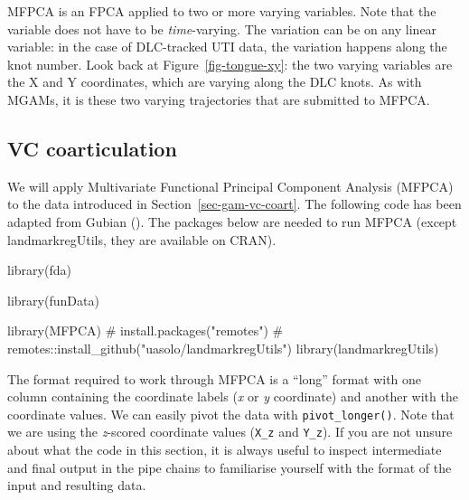 \documentclass[
  man,
  longtable,
  nolmodern,
  notxfonts,
  notimes,
  colorlinks=true,linkcolor=blue,citecolor=blue,urlcolor=blue]{apa7}
\newenvironment{Shaded}{\begin{snugshade}}{\end{snugshade}}
\newcommand{\CommentTok}[1]{\textcolor[rgb]{0.37,0.37,0.37}{#1}}
\newcommand{\FunctionTok}[1]{\textcolor[rgb]{0.28,0.35,0.67}{#1}}
\newcommand{\NormalTok}[1]{\textcolor[rgb]{0.00,0.23,0.31}{#1}}
\begin{document}
MFPCA is an FPCA applied to two or more varying variables. Note that the
variable does not have to be \emph{time}-varying. The variation can be
on any linear variable: in the case of DLC-tracked UTI data, the
variation happens along the knot number. Look back at
Figure~\ref{fig-tongue-xy}: the two varying variables are the X and Y
coordinates, which are varying along the DLC knots. As with MGAMs, it is
these two varying trajectories that are submitted to MFPCA.

\subsection{VC coarticulation}\label{sec-fpca-vc}

We will apply Multivariate Functional Principal Component Analysis
(MFPCA) to the data introduced in Section~\ref{sec-gam-vc-coart}. The
following code has been adapted from Gubian
(). The packages below are needed to run
MFPCA (except landmarkregUtils, they are available on CRAN).

\begin{Shaded}
\begin{Highlighting}[]
\FunctionTok{library}\NormalTok{(fda)}
\end{Highlighting}
\end{Shaded}

\begin{Shaded}
\begin{Highlighting}[]
\FunctionTok{library}\NormalTok{(funData)}
\end{Highlighting}
\end{Shaded}

\begin{Shaded}
\begin{Highlighting}[]
\FunctionTok{library}\NormalTok{(MFPCA)}
\CommentTok{\# install.packages("remotes")}
\CommentTok{\# remotes::install\_github("uasolo/landmarkregUtils")}
\FunctionTok{library}\NormalTok{(landmarkregUtils)}
\end{Highlighting}
\end{Shaded}

The format required to work through MFPCA is a ``long'' format with one
column containing the coordinate labels (\emph{x} or \emph{y}
coordinate) and another with the coordinate values. We can easily pivot
the data with \texttt{pivot\_longer()}. Note that we are using the
\emph{z}-scored coordinate values (\texttt{X\_z} and \texttt{Y\_z}). If
you are not unsure about what the code in this section, it is always
useful to inspect intermediate and final output in the pipe chains to
familiarise yourself with the format of the input and resulting data.
\end{document}
